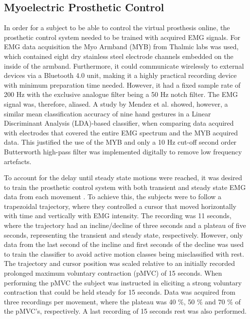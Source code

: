 \subsection{Myoelectric Prosthetic Control}

In order for a subject to be able to control the virtual prosthesis online, the prosthetic control system needed to be trained with acquired EMG signals. For EMG data acquisition the Myo Armband (MYB) from Thalmic labs was used, which contained eight dry stainless steel electrode channels embedded on the inside of the armband. Furthermore, it could communicate wirelessly to external devices via a Bluetooth 4.0 unit, making it a highly practical recording device with minimum preparation time needed. However, it had a fixed sample rate of 200 Hz with the exclusive analogue filter being a 50 Hz notch filter. The EMG signal was, therefore, aliased. A study by Mendez et al. \cite{Mendez2017} showed, however, a similar mean classification accuracy of nine hand gestures in a Linear Discriminant Analysis (LDA)-based classifier, when comparing data acquired with electrodes that covered the entire EMG spectrum and the MYB acquired data. This justified the use of the MYB and only a 10 Hz cut-off second order Butterworth high-pass filter was implemented digitally to remove low frequency artefacts.

To account for the delay until steady state motions were reached, it was desired to train the prosthetic control system with both transient and steady state EMG data from each movement \cite{Boschmann2013}. To achieve this, the subjects were to follow a trapezoidal trajectory, where they controlled a cursor that moved horizontally with time and vertically with EMG intensity. The recording was 11 seconds, where the trajectory had an incline/decline of three seconds and a plateau of five seconds, representing the transient and steady state, respectively. However, only data from the last second of the incline and first seconds of the decline was used to train the classifier to avoid active motion classes being misclassified with rest. The trajectory and cursor position was scaled relative to an initially recorded prolonged maximum voluntary contraction (pMVC) of 15 seconds. When performing the pMVC the subject was instructed in eliciting a strong voluntary contraction that could be held steady for 15 seconds. Data was acquired from three recordings per movement, where the plateau was 40 $\%$, 50 $\%$ and 70 $\%$ of the pMVC's, respectively. A last recording of 15 seconds rest was also performed.


